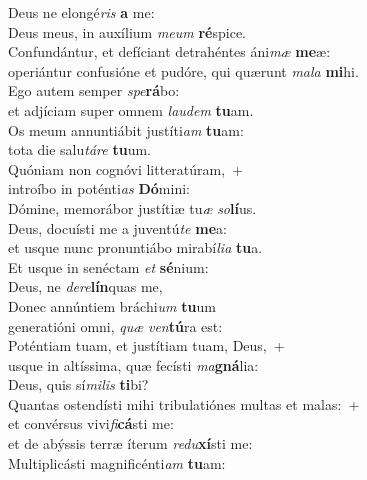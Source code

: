 \oddverse Deus ne elongé\textit{ris} \textbf{a} me:~\*\\
\oddverse Deus meus, in auxílium \textit{me}\textit{um} \textbf{ré}spice.\\
\evenverse Confundántur, et defíciant detrahéntes áni\textit{mæ} \textbf{me}æ:~\*\\
\evenverse operiántur confusióne et pudóre, qui quærunt \textit{ma}\textit{la} \textbf{mi}hi.\\
\oddverse Ego autem semper \textit{spe}\textbf{rá}bo:~\*\\
\oddverse et adjíciam super omnem \textit{lau}\textit{dem} \textbf{tu}am.\\
\evenverse Os meum annuntiábit justíti\textit{am} \textbf{tu}am:~\*\\
\evenverse tota die salu\textit{tá}\textit{re} \textbf{tu}um.\\
\oddverse Quóniam non cognóvi litteratúram,~+\\
\oddverse  introíbo in poténti\textit{as} \textbf{Dó}mini:~\*\\
\oddverse Dómine, memorábor justítiæ tu\textit{æ} \textit{so}\textbf{lí}us.\\
\evenverse Deus, docuísti me a juventú\textit{te} \textbf{me}a:~\*\\
\evenverse et usque nunc pronuntiábo mirabí\textit{li}\textit{a} \textbf{tu}a.\\
\oddverse Et usque in senéctam \textit{et} \textbf{sé}nium:~\*\\
\oddverse Deus, ne \textit{de}\textit{re}\textbf{lín}quas me,\\
\evenverse Donec annúntiem bráchi\textit{um} \textbf{tu}um~\*\\
\evenverse generatióni omni, \textit{quæ} \textit{ven}\textbf{tú}ra est:\\
\oddverse Poténtiam tuam, et justítiam tuam, Deus,~+\\
\oddverse  usque in altíssima, quæ fecísti \textit{ma}\textbf{gná}lia:~\*\\
\oddverse Deus, quis sí\textit{mi}\textit{lis} \textbf{ti}bi?\\
\evenverse Quantas ostendísti mihi tribulatiónes multas et malas:~+\\
\evenverse  et convérsus vivi\textit{fi}\textbf{cá}sti me:~\*\\
\evenverse et de abýssis terræ íterum \textit{re}\textit{du}\textbf{xí}sti me:\\
\oddverse Multiplicásti magnificénti\textit{am} \textbf{tu}am:~\*\\
